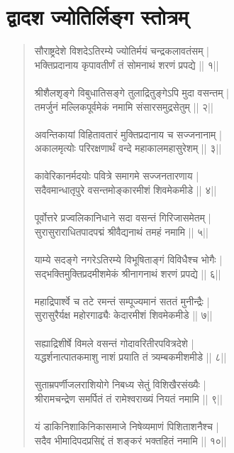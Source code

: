 \section{\sanskrit द्वादश ज्योतिर्लिङ्ग स्तोत्रम् }
\begin{quotation}\chandas
सौराष्ट्रदेशे विशदेऽतिरम्ये ज्योतिर्मयं चन्द्रकलावतंसम् |\\
भक्तिप्रदानाय कृपावतीर्णं तं सोमनाथं शरणं प्रपद्ये || १||\\
\\
श्रीशैलशृङ्गे विबुधातिसङ्गे तुलाद्रितुङ्गेऽपि मुदा वसन्तम् |\\
तमर्जुनं मल्लिकपूर्वमेकं नमामि संसारसमुद्रसेतुम् || २||\\
\\
अवन्तिकायां विहितावतारं मुक्तिप्रदानाय च सज्जनानाम् |\\
अकालमृत्योः परिरक्षणार्थं वन्दे महाकालमहासुरेशम् || ३||\\
\\
कावेरिकानर्मदयोः पवित्रे समागमे सज्जनतारणाय |\\
सदैवमान्धातृपुरे वसन्तमोङ्कारमीशं शिवमेकमीडे || ४||\\
\\
पूर्वोत्तरे प्रज्वलिकानिधाने सदा वसन्तं गिरिजासमेतम् |\\
सुरासुराराधितपादपद्मं श्रीवैद्यनाथं तमहं नमामि || ५||\\
\\
याम्ये सदङ्गे नगरेऽतिरम्ये विभूषिताङ्गं विविधैश्च भोगैः |\\
सद्भक्तिमुक्तिप्रदमीशमेकं श्रीनागनाथं शरणं प्रपद्ये || ६||\\
\\
महाद्रिपार्श्वे च तटे रमन्तं सम्पूज्यमानं सततं मुनीन्द्रैः |\\
सुरासुरैर्यक्ष महोरगाढ्यैः केदारमीशं शिवमेकमीडे || ७||\\
\\
सह्याद्रिशीर्षे विमले वसन्तं गोदावरितीरपवित्रदेशे |\\
यद्धर्शनात्पातकमाशु नाशं प्रयाति तं त्र्यम्बकमीशमीडे || ८||\\
\\
सुताम्रपर्णीजलराशियोगे निबध्य सेतुं विशिखैरसंख्यैः |\\
श्रीरामचन्द्रेण समर्पितं तं रामेश्वराख्यं नियतं नमामि || ९||\\
\\
यं डाकिनिशाकिनिकासमाजे निषेव्यमाणं पिशिताशनैश्च |\\
सदैव भीमादिपदप्रसिद्दं तं शङ्करं भक्तहितं नमामि || १०||\\

\end{quotation}
